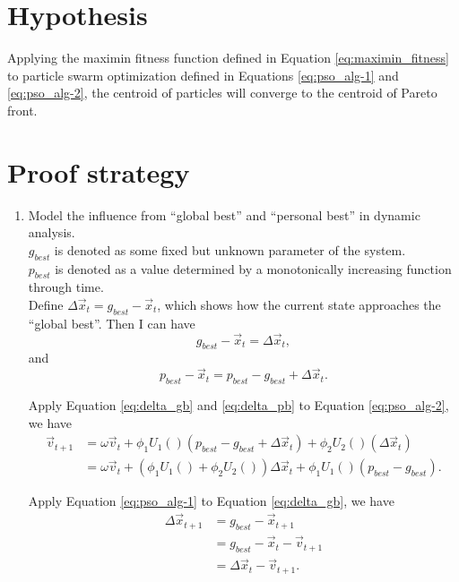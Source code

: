 \documentclass[12pt]{article}
\begin{document}
\section{Hypothesis}

Applying the maximin fitness function defined in Equation \eqref{eq:maximin_fitness} to particle swarm optimization defined in Equations \eqref{eq:pso_alg-1} and \eqref{eq:pso_alg-2}, the centroid of particles will converge to the centroid of Pareto front.

\section{Proof strategy}

\begin{enumerate}
\item Model the influence from ``global best'' and ``personal best'' in dynamic analysis. \\
$ g_{best} $ is denoted as some fixed but unknown parameter of the system. \\
$ p_{best} $ is denoted as a value determined by a monotonically increasing function through time. \\
Define $ \Delta\vec{x}_{t} = g_{best} - \vec{x}_{t} $, which shows how the current state approaches the ``global best''.
Then I can have
\begin{equation}
\label{eq:delta_gb}
g_{best} - \vec{x}_{t} = \Delta\vec{x}_{t},
\end{equation}
and  
\begin{equation}
\label{eq:delta_pb}
p_{best} - \vec{x}_{t} = p_{best} - g_{best} + \Delta\vec{x}_{t}.
\end{equation}

Apply Equation \eqref{eq:delta_gb} and \eqref{eq:delta_pb} to Equation \eqref{eq:pso_alg-2}, we have
\begin{equation}
\label{eq:trans_vel}
\begin{aligned}
\vec{v}_{t+1}  & = \omega \vec{v}_{t} + \phi_{1} U_{1}() (p_{best} - g_{best} + \Delta\vec{x}_{t}) + \phi_{2} U_{2}() (\Delta{\vec{x}_{t}}) \\
& = \omega \vec{v}_{t} + (\phi_{1} U_{1}() + \phi_{2} U_{2}()) \Delta\vec{x}_{t} + \phi_{1} U_{1}() (p_{best} - g_{best}).
\end{aligned}
\end{equation}

Apply Equation \eqref{eq:pso_alg-1} to Equation \eqref{eq:delta_gb}, we have
\begin{equation}
\label{eq:trans_del_pos}
\begin{aligned}
\Delta \vec{x}_{t+1} & = g_{best} - \vec{x}_{t+1} \\
& = g_{best} - \vec{x}_{t} - \vec{v}_{t+1} \\
& = \Delta \vec{x}_{t} - \vec{v}_{t+1}.
\end{aligned}
\end{equation}


\end{enumerate}
\end{document}

